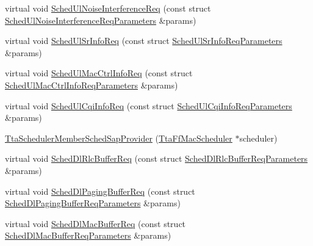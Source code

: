 \begin{DoxyCompactItemize}
\item 
virtual void \hyperlink{classns3_1_1TtaSchedulerMemberSchedSapProvider_aaebc8cdc9535afc0a21ff05614e6fbae}{Sched\+Ul\+Noise\+Interference\+Req} (const struct \hyperlink{structns3_1_1FfMacSchedSapProvider_1_1SchedUlNoiseInterferenceReqParameters}{Sched\+Ul\+Noise\+Interference\+Req\+Parameters} \&params)
\item 
virtual void \hyperlink{classns3_1_1TtaSchedulerMemberSchedSapProvider_a19775f15e58b2c041768087d99008614}{Sched\+Ul\+Sr\+Info\+Req} (const struct \hyperlink{structns3_1_1FfMacSchedSapProvider_1_1SchedUlSrInfoReqParameters}{Sched\+Ul\+Sr\+Info\+Req\+Parameters} \&params)
\item 
virtual void \hyperlink{classns3_1_1TtaSchedulerMemberSchedSapProvider_a3ddd2d29d14e0c9ad24794d40d3e6537}{Sched\+Ul\+Mac\+Ctrl\+Info\+Req} (const struct \hyperlink{structns3_1_1FfMacSchedSapProvider_1_1SchedUlMacCtrlInfoReqParameters}{Sched\+Ul\+Mac\+Ctrl\+Info\+Req\+Parameters} \&params)
\item 
virtual void \hyperlink{classns3_1_1TtaSchedulerMemberSchedSapProvider_ad320d59af506625a643d3472e729f3d2}{Sched\+Ul\+Cqi\+Info\+Req} (const struct \hyperlink{structns3_1_1FfMacSchedSapProvider_1_1SchedUlCqiInfoReqParameters}{Sched\+Ul\+Cqi\+Info\+Req\+Parameters} \&params)
\item 
\hyperlink{classns3_1_1TtaSchedulerMemberSchedSapProvider_ac9e6ab08fa5dc5687aa66b97cb96d41e}{Tta\+Scheduler\+Member\+Sched\+Sap\+Provider} (\hyperlink{classns3_1_1TtaFfMacScheduler}{Tta\+Ff\+Mac\+Scheduler} $\ast$scheduler)
\item 
virtual void \hyperlink{classns3_1_1TtaSchedulerMemberSchedSapProvider_adfa82412b90b25990c4098b7f81a124a}{Sched\+Dl\+Rlc\+Buffer\+Req} (const struct \hyperlink{structns3_1_1FfMacSchedSapProvider_1_1SchedDlRlcBufferReqParameters}{Sched\+Dl\+Rlc\+Buffer\+Req\+Parameters} \&params)
\item 
virtual void \hyperlink{classns3_1_1TtaSchedulerMemberSchedSapProvider_a0cce79e87dd8299c7dff5f343ba0f9b1}{Sched\+Dl\+Paging\+Buffer\+Req} (const struct \hyperlink{structns3_1_1FfMacSchedSapProvider_1_1SchedDlPagingBufferReqParameters}{Sched\+Dl\+Paging\+Buffer\+Req\+Parameters} \&params)
\item 
virtual void \hyperlink{classns3_1_1TtaSchedulerMemberSchedSapProvider_ac0ec9566453d0becb4a4fa5b3eb44af3}{Sched\+Dl\+Mac\+Buffer\+Req} (const struct \hyperlink{structns3_1_1FfMacSchedSapProvider_1_1SchedDlMacBufferReqParameters}{Sched\+Dl\+Mac\+Buffer\+Req\+Parameters} \&params)
\item 

\end{DoxyCompactItemize}
